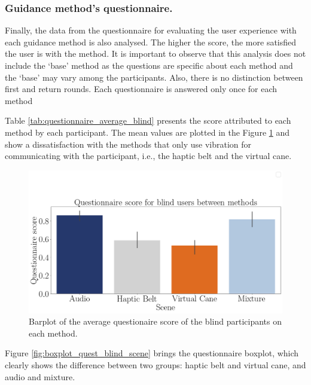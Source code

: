 \subsubsection{Guidance method's questionnaire.}
\label{subsubsec:results_questionnaires}

Finally, the data from the questionnaire for evaluating the user experience with each guidance method is also analysed. The higher the score, the more satisfied the user is with the method. It is important to observe that this analysis does not include the ‘base’ method as the questions are specific about each method and the ‘base’ may vary among the participants. Also, there is no distinction between first and return rounds. Each questionnaire is answered only once for each method

Table \ref{tab:questionnaire_average_blind} presents the score attributed to each method by each participant. The mean values are plotted in the Figure \ref{fig:barplot_questionnaire_scene_blind} and show a dissatisfaction with the methods that only use vibration for communicating with the participant, i.e., the haptic belt and the virtual cane. 



\begin{figure}[!htb]
    \centering
    \includegraphics[width = 0.8\linewidth]{Resultados/Questionario/Figuras/png/barplot_questionnaire_scene_blind.png}
    \caption{Barplot of the average questionaire score of the blind participants on each method.}
    \label{fig:barplot_questionnaire_scene_blind}
\end{figure}

Figure \ref{fig:boxplot_quest_blind_scene} brings the questionnaire boxplot, which clearly shows the difference between two groups: haptic belt and virtual cane, and audio and mixture. 


